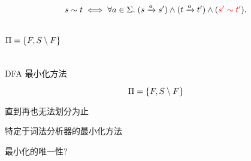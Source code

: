 \begin{frame}{}
  \[
    s \sim t \iff \forall a \in \Sigma.\; 
      (s \xrightarrow{a} s') \land (t \xrightarrow{a} t') \land (\textcolor{red}{s' \sim t'}).
  \]

  \begin{center}
  \end{center}

  \begin{columns}
      \[
        \Pi = \{F, S \setminus F\}
      \]
      \pause
  \end{columns}
\end{frame}

\begin{frame}{}
  \begin{center}
    DFA 最小化方法
  \end{center}

  \[
    \Pi = \{F, S \setminus F\}
  \]
  

  \begin{center}
    直到再也无法划分为止
  \end{center}
\end{frame}

\begin{frame}{}
  特定于词法分析器的最小化方法
\end{frame}

\begin{frame}{}
  最小化的唯一性?
\end{frame}
